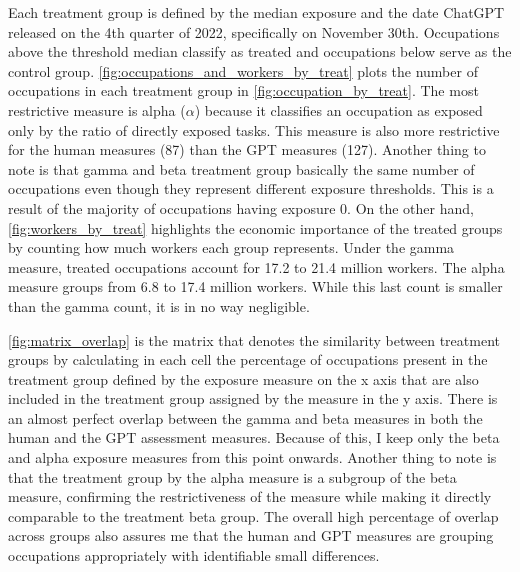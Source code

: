 Each treatment group is defined by the median exposure and the date ChatGPT released on the 4th quarter of 2022, specifically on  November 30th. Occupations above the threshold median classify as treated and occupations below serve as the control group. \cref{fig:occupations_and_workers_by_treat} plots the number of occupations in each treatment group in \cref{fig:occupation_by_treat}. The most restrictive measure is alpha ($\alpha$) because it classifies an occupation as exposed only by the ratio of directly exposed tasks. This measure is also more restrictive for the human measures (87) than the GPT measures (127). Another thing to note is that gamma and beta treatment group basically the same number of occupations even though they represent different exposure thresholds. This is a result of the majority of occupations having exposure 0. On the other hand, \cref{fig:workers_by_treat} highlights the economic importance of the treated groups by counting how much workers each group represents. Under the gamma measure, treated occupations account for 17.2 to 21.4 million workers. The alpha measure groups from 6.8 to 17.4 million workers. While this last count is smaller than the gamma count, it is in no way negligible.

\cref{fig:matrix_overlap} is the matrix that denotes the similarity between treatment groups by calculating in each cell the percentage of occupations present in the treatment group defined by the exposure measure on the x axis that are also included in the treatment group assigned by the measure in the y axis. There is an almost perfect overlap between the gamma and beta measures in both the human and the GPT assessment measures. Because of this, I keep only the beta and alpha exposure measures from this point onwards. Another thing to note is that the treatment group by the alpha measure is a subgroup of the beta measure, confirming the restrictiveness of the measure while making it directly comparable to the treatment beta group. The overall high percentage of overlap across groups also assures me that the human and GPT measures are grouping occupations appropriately with identifiable small differences.

